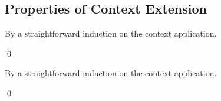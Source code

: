 \subsection{Properties of Context Extension}

\begin{lemma}[\DeclarationPreservationName]
  \label{lemma:\DeclarationPreservationName}
  \DeclarationPreservationBody
\end{lemma}
\proof

By a straightforward induction on the context application.

\qed

\begin{lemma}[\ReverseDeclarationPreservationName]
  \label{lemma:\ReverseDeclarationPreservationName}
  \ReverseDeclarationPreservationBody
\end{lemma}
\proof

By a straightforward induction on the context application.

\qed


\begin{lemma}[\DeclarationOrderPreservationName]
  \label{lemma:\DeclarationOrderPreservationName}
  \DeclarationOrderPreservationBody
\end{lemma}
\proof

